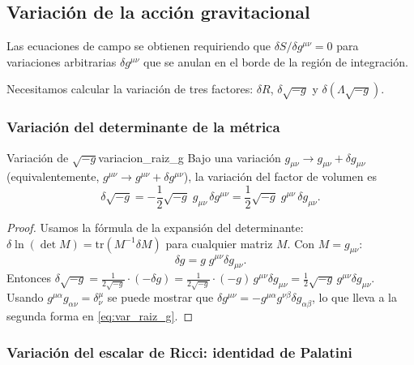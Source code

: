 \subsection{Variación de la acción gravitacional}

Las ecuaciones de campo se obtienen requiriendo que $\delta S/\delta g^{\mu\nu} = 0$ para variaciones arbitrarias $\delta g^{\mu\nu}$ que se anulan en el borde de la región de integración.

Necesitamos calcular la variación de tres factores: $\delta R$, $\delta\sqrt{-g}$ y $\delta(\Lambda\sqrt{-g})$.

\subsubsection*{Variación del determinante de la métrica}

\begin{lema}{Variación de $\sqrt{-g}$}{variacion_raiz_g}
Bajo una variación $g_{\mu\nu} \to g_{\mu\nu} + \delta g_{\mu\nu}$ (equivalentemente, $g^{\mu\nu} \to g^{\mu\nu} + \delta g^{\mu\nu}$), la variación del factor de volumen es
\begin{equation}
  \delta\sqrt{-g} = -\frac{1}{2}\sqrt{-g}\;g_{\mu\nu}\,\delta g^{\mu\nu} = \frac{1}{2}\sqrt{-g}\;g^{\mu\nu}\,\delta g_{\mu\nu}.
  \label{eq:var_raiz_g}
\end{equation}
\end{lema}

\begin{proof}
Usamos la fórmula de la expansión del determinante: $\delta\ln(\det M) = \mathrm{tr}(M^{-1}\delta M)$ para cualquier matriz $M$. Con $M = g_{\mu\nu}$:
\begin{equation}
  \delta g = g\;g^{\mu\nu}\delta g_{\mu\nu}.
\end{equation}
Entonces $\delta\sqrt{-g} = \frac{1}{2\sqrt{-g}}\cdot(-\delta g) = \frac{1}{2\sqrt{-g}}\cdot(-g)\,g^{\mu\nu}\delta g_{\mu\nu} = \frac{1}{2}\sqrt{-g}\,g^{\mu\nu}\delta g_{\mu\nu}$.
Usando $g^{\mu\alpha}g_{\alpha\nu} = \delta^\mu_\nu$ se puede mostrar que $\delta g^{\mu\nu} = -g^{\mu\alpha}g^{\nu\beta}\delta g_{\alpha\beta}$, lo que lleva a la segunda forma en \eqref{eq:var_raiz_g}. \qedhere
\end{proof}

\subsubsection*{Variación del escalar de Ricci: identidad de Palatini}

